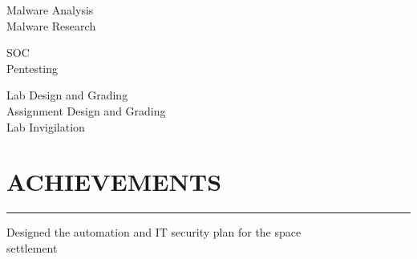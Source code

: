 \documentclass[]{resume}
\begin{document}
\begin{minipage}[t]{0.66\textwidth}
     
    \noindent

    \vspace{-8pt}
    \hspace{5em}
    \begin{minipage}{0.85\textwidth\vspace{2pt}}
        Malware Analysis\\
        Malware Research
    \end{minipage}

    \vspace{8pt}
     
    \noindent

    \vspace{-8pt}
    \hspace{5em}
    \begin{minipage}{0.85\textwidth\vspace{2pt}}
        SOC\\
        Pentesting
    \end{minipage}


    \vspace{8pt}
     
    \noindent

    \vspace{-8pt}
    \hspace{5 em}
    \begin{minipage}{0.85\textwidth\vspace{2pt}}
        Lab Design and Grading\\
        Assignment Design and Grading\\
        Lab Invigilation
    \end{minipage}



    \section{ACHIEVEMENTS}
    \noindent\rule{12.80cm}{0.4pt}

     
    \vspace{4pt}
    \begin{minipage}{0.85\textwidth\vspace{4pt}}
        Designed the automation and IT security plan for the space\\settlement
    \end{minipage}


\end{minipage}
\end{document}
